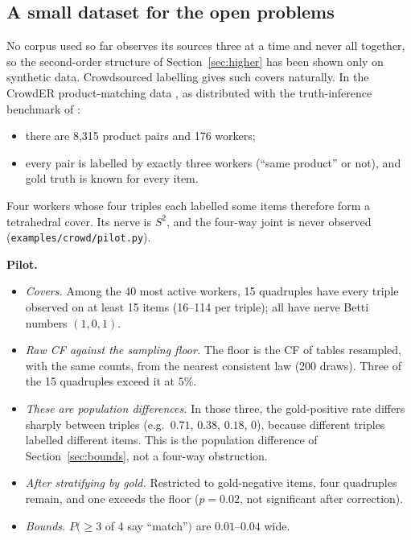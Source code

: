 \documentclass[11pt]{article}
\theoremstyle{definition}
\theoremstyle{remark}
\begin{document}
\subsection{A small dataset for the open problems}\label{sec:crowd}
No corpus used so far observes its sources three at a time and never all together, so the second-order structure of Section~\ref{sec:higher} has been shown only on synthetic data. Crowdsourced labelling gives such covers naturally. In the CrowdER product-matching data \cite{wang12crowder}, as distributed with the truth-inference benchmark of \cite{zheng17truth}:
\begin{itemize}
  \item there are 8,315 product pairs and 176 workers;
  \item every pair is labelled by exactly three workers (``same product'' or not), and gold truth is known for every item.
\end{itemize}
Four workers whose four triples each labelled some items therefore form a tetrahedral cover. Its nerve is $S^2$, and the four-way joint is never observed (\texttt{examples/crowd/pilot.py}).

\textbf{Pilot.}
\begin{itemize}
  \item \emph{Covers.} Among the 40 most active workers, 15 quadruples have every triple observed on at least 15 items (16--114 per triple); all have nerve Betti numbers $(1,0,1)$.
  \item \emph{Raw CF against the sampling floor.} The floor is the CF of tables resampled, with the same counts, from the nearest consistent law (200 draws). Three of the 15 quadruples exceed it at $5\%$.
  \item \emph{These are population differences.} In those three, the gold-positive rate differs sharply between triples (e.g.\ $0.71$, $0.38$, $0.18$, $0$), because different triples labelled different items. This is the population difference of Section~\ref{sec:bounds}, not a four-way obstruction.
  \item \emph{After stratifying by gold.} Restricted to gold-negative items, four quadruples remain, and one exceeds the floor ($p=0.02$, not significant after correction).
  \item \emph{Bounds.} $P(\ge3$ of $4$ say ``match''$)$ are $0.01$--$0.04$ wide.
\end{itemize}
\end{document}
